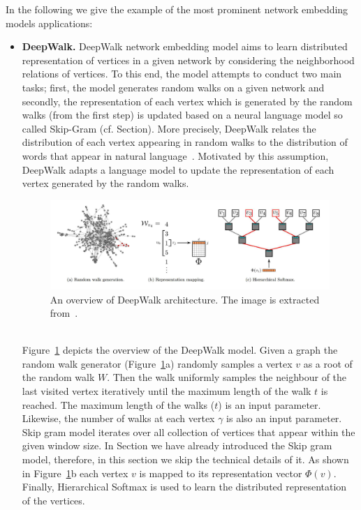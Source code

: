 In the following we give the example of the most prominent network embedding models applications:\\
\begin{itemize}
\item \textbf{DeepWalk.}
DeepWalk network embedding model aims to learn distributed representation of vertices in a given network by considering the neighborhood relations of vertices. To this end, the model attempts to conduct two main tasks; first, the model generates random walks on a given network and secondly, the representation of each vertex which is generated by the random walks (from the first step) is updated based on a neural language model so called Skip-Gram (cf. Section). More precisely, DeepWalk relates the distribution of each vertex appearing in random walks to the distribution of words that appear in natural language~\cite{DBLP:journals/tkde/CuiWPZ19}. Motivated by this assumption, DeepWalk adapts a language model  to update the representation of each vertex generated by the random walks.
\begin{figure}[h]
 \includegraphics[width=\linewidth]{Figures/fig_deepwalk.png}
 \caption{An overview of DeepWalk architecture. The image is extracted from~\protect\cite{DeepWalk}.}
 \label{fig:deepWalk}
\end{figure} \\
Figure~\ref{fig:deepWalk} depicts the overview of the DeepWalk model. Given a graph the random walk generator (Figure~\ref{fig:deepWalk}a) randomly samples a vertex $v$ as a root of the random walk $W$. Then the walk uniformly samples the neighbour of the last visited vertex iteratively until the maximum length of the walk $t$ is reached. The maximum length of the walks ($t$) is an input parameter. Likewise, the number of walks at each vertex $\gamma$ is also an input parameter.\\ 
Skip gram model iterates over all collection of vertices that appear within the given window size. In Section we have already  introduced the Skip gram model, therefore, in this section we skip the technical details of it. As shown in Figure~\ref{fig:deepWalk}b each vertex $v$ is mapped to its  representation vector $\Phi(v)$. Finally, Hierarchical Softmax is used to learn the distributed representation of the vertices. \\
 

\end{itemize}
